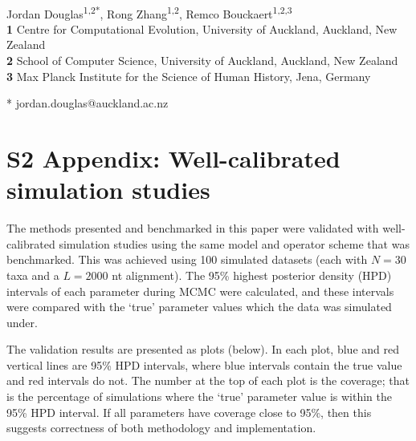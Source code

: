 \documentclass[12pt]{article}
\begin{document}
\vspace*{0.2in}

\begin{flushleft}
{\Large
\textbf{} %
}
\newline
\\
Jordan Douglas\textsuperscript{1,2*},
Rong Zhang\textsuperscript{1,2},
Remco Bouckaert\textsuperscript{1,2,3}
\\
\bigskip
\textbf{1} Centre for Computational Evolution,  University of Auckland, Auckland, New Zealand\\
\textbf{2} School of Computer Science, University of Auckland, Auckland, New Zealand\\
\textbf{3} Max Planck Institute for the Science of Human History, Jena, Germany\\
\bigskip


* jordan.douglas@auckland.ac.nz


\end{flushleft}


\section*{S2 Appendix: Well-calibrated simulation studies}


The methods presented and benchmarked in this paper were validated with well-calibrated simulation studies using the same model and operator scheme that was benchmarked. 
This was achieved using 100 simulated datasets (each with $N=30$ taxa and a $L=2000$ nt alignment).
The 95\% highest posterior density (HPD) intervals of each parameter during MCMC were calculated, and these intervals were compared with the `true' parameter values which the data was simulated under. 


The validation results are presented as plots (below). 
In each plot, blue and red vertical lines are 95\% HPD intervals, where blue intervals contain the true value and red intervals do not.
The number at the top of each plot is the coverage; that is the percentage of simulations where the `true' parameter value is within the 95\% HPD interval. 
If all parameters have coverage close to 95\%, then this suggests correctness of both methodology and implementation.
\end{document}
